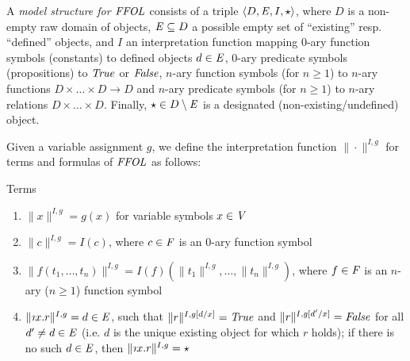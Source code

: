 \begin{definition}
  A \emph{model structure for $\mathit{FFOL}$} consists of a triple
  $\langle D, \mathit{E}, I, \star\rangle$, where $D$ is a non-empty raw domain of
  objects, $\mathit{E}\subseteq D$ a possible empty set of ``existing''
  resp. ``defined'' objects, and $I$ an interpretation function
  mapping 0-ary function symbols (constants) to defined objects $d\in \mathit{E}$, 
 0-ary predicate symbols (propositions) to $\mathit{True}$ or $\mathit{False}$, 
  $n$-ary function symbols (for $n\geq 1$) to $n$-ary functions
  $D \times \ldots \times D \longrightarrow D$ and $n$-ary predicate
  symbols (for $n\geq 1$) to $n$-ary relations
  $D \times \ldots \times D$. Finally, $\star\in D\setminus \mathit{E}$ is a designated
  (non-existing/undefined) object. 

  Given a variable assignment $g$, we
  define the interpretation function $\|\cdot\|^{I,g}$ for terms and formulas of
  $\mathit{FFOL}$ as follows:
\noindent
\begin{description}
\item{Terms}
\begin{enumerate}
\item $\| x \|^{I,g} = g(x)$ for variable symbols $x\in\mathit{V}$
\item $\| c \|^{I,g} = I(c)$, where $c\in\mathit{F}$ is an 0-ary function symbol
\item $\| f(t_1,\ldots,t_n)\|^{I,g} = I(f)(\| t_1 \|^{I,g},\ldots,\|
  t_n \|^{I,g})$, where $f\in\mathit{F}$ is an $n$-ary ($n\geq 1$) function symbol
\item $\| \Descr x. r \|^{I,g} = d \in \ex$, such that $\| r
  \|^{I,g[d/x]} = \mathit{True}$ and  $\| r
  \|^{I,g[d'/x]} = \mathit{False}$ for all $d'\not=d\in \mathit{E}$ (i.e. $d$ is the
  unique existing object for which $r$ holds); if there is no
  such $d\in \mathit{E}$, then $\| \Descr x. r \|^{I,g} = \star$
\end{enumerate}


\end{description}
\end{definition}
